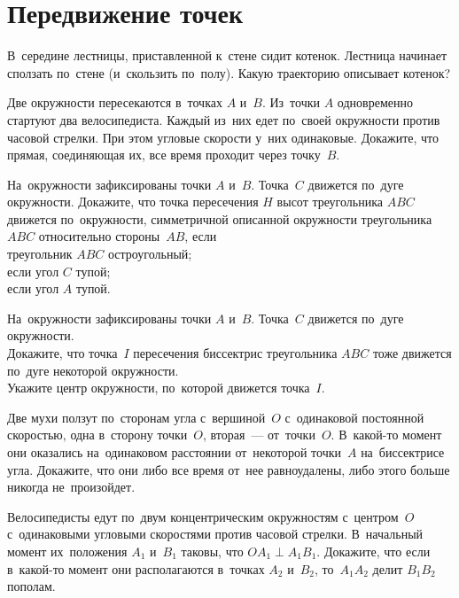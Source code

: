 
\section*{Передвижение точек}


\begin{problems}

\item
В~середине лестницы, приставленной к~стене сидит котенок.
Лестница начинает сползать по~стене (и~скользить по~полу).
Какую траекторию описывает котенок?

\item
Две окружности пересекаются в~точках $A$ и~$B$.
Из~точки $A$ одновременно стартуют два велосипедиста.
Каждый из~них едет по~своей окружности против часовой стрелки.
При этом угловые скорости у~них одинаковые.
Докажите, что прямая, соединяющая их, все время проходит через точку~$B$.

\item
На~окружности зафиксированы точки $A$ и~$B$.
Точка~$C$ движется по~дуге окружности.
Докажите, что точка пересечения $H$ высот треугольника $ABC$ движется
по~окружности, симметричной описанной окружности треугольника $ABC$
относительно стороны~$AB$, если
\\
\sp треугольник $ABC$ остроугольный;
\\
\sp если угол $C$ тупой;
\\
\sp если угол $A$ тупой.

\item
На~окружности зафиксированы точки $A$ и~$B$.
Точка~$C$ движется по~дуге окружности.
\\
\sp
Докажите, что точка~$I$ пересечения биссектрис треугольника $ABC$ тоже движется
по~дуге некоторой окружности.
\\
\sp
Укажите центр окружности, по~которой движется точка~$I$.

\item
Две мухи ползут по~сторонам угла с~вершиной~$O$ с~одинаковой постоянной
скоростью, одна в~сторону точки~$O$, вторая~--- от~точки~$O$.
В~какой-то момент они оказались на~одинаковом расстоянии
от~некоторой точки~$A$ на~биссектрисе угла.
Докажите, что они либо все время от~нее равноудалены, либо этого больше никогда
не~произойдет.

\item
Велосипедисты едут по~двум концентрическим окружностям с~центром~$O$
с~одинаковыми угловыми скоростями против часовой стрелки.
В~начальный момент их~положения $A_1$ и~$B_1$ таковы, что
$O A_1 \perp A_1 B_1$.
Докажите, что если в~какой-то момент они располагаются в~точках $A_2$ и~$B_2$,
то~$A_1 A_2$ делит $B_1 B_2$ пополам.


\end{problems}
